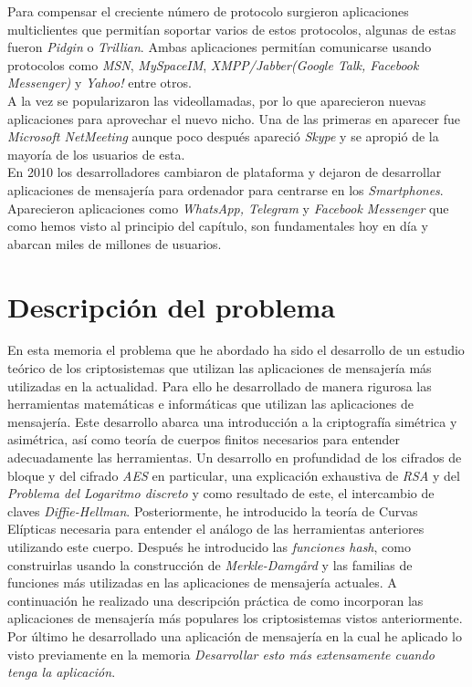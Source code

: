 Para compensar el creciente número de protocolo surgieron aplicaciones multiclientes que permitían soportar varios de estos protocolos, algunas de estas fueron \emph{Pidgin} o \emph{Trillian}. Ambas aplicaciones permitían comunicarse usando protocolos como \emph{MSN}, \emph{MySpaceIM}, \emph{XMPP/Jabber(Google Talk, Facebook Messenger)} y \emph{Yahoo!} entre otros.\\ 
A la vez se popularizaron las videollamadas, por lo que aparecieron nuevas aplicaciones para aprovechar el nuevo nicho. Una de las primeras en aparecer fue \emph{Microsoft NetMeeting} aunque poco después apareció \emph{Skype} y se apropió de la mayoría de los usuarios de esta.\\
En 2010 los desarrolladores cambiaron de plataforma y dejaron de desarrollar aplicaciones de mensajería para ordenador para centrarse en los \emph{Smartphones}. Aparecieron aplicaciones como \emph{WhatsApp, Telegram} y \emph{Facebook Messenger} que como hemos visto al principio del capítulo, son fundamentales hoy en día y abarcan miles de millones de usuarios.

\section{Descripción del problema}
En esta memoria el problema que he abordado ha sido el desarrollo de un estudio teórico de los criptosistemas que utilizan las aplicaciones de mensajería más utilizadas en la actualidad. Para ello he desarrollado de manera rigurosa las herramientas matemáticas e informáticas que utilizan las aplicaciones de mensajería. Este desarrollo abarca una introducción a la criptografía simétrica y asimétrica, así como teoría de cuerpos finitos necesarios para entender adecuadamente las herramientas.
Un desarrollo en profundidad de los cifrados de bloque y del cifrado \emph{AES} en particular, una explicación exhaustiva de \emph{RSA} y del \emph{Problema del Logaritmo discreto} y como resultado de este, el intercambio de claves \emph{Diffie-Hellman}. Posteriormente, he introducido la teoría de Curvas Elípticas necesaria para entender el análogo de las herramientas anteriores utilizando este cuerpo.
Después he introducido las \emph{funciones hash}, como construirlas usando la construcción de \emph{Merkle-Damgård} y las familias de funciones más utilizadas en las aplicaciones de mensajería actuales. A continuación he realizado una descripción práctica de como incorporan las aplicaciones de mensajería más populares los criptosistemas vistos anteriormente. Por último he desarrollado una aplicación de mensajería en la cual he aplicado lo visto previamente en la memoria \emph{Desarrollar esto más extensamente cuando tenga la aplicación}. 

